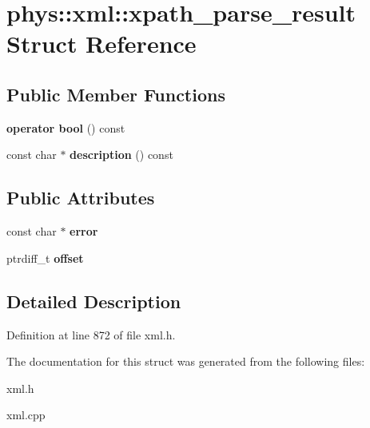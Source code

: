 \hypertarget{structphys_1_1xml_1_1xpath__parse__result}{
\section{phys::xml::xpath\_\-parse\_\-result Struct Reference}
\label{d3/d82/structphys_1_1xml_1_1xpath__parse__result}
}
\subsection*{Public Member Functions}
\begin{DoxyCompactItemize}
\item 
\hypertarget{structphys_1_1xml_1_1xpath__parse__result_a6dcc7705327a53c40d27951f1fa135e8}{
{\bfseries operator bool} () const }
\label{d3/d82/structphys_1_1xml_1_1xpath__parse__result_a6dcc7705327a53c40d27951f1fa135e8}

\item 
\hypertarget{structphys_1_1xml_1_1xpath__parse__result_ad4a6c1b6f5b15a51f363eb1ba80ba328}{
const char $\ast$ {\bfseries description} () const }
\label{d3/d82/structphys_1_1xml_1_1xpath__parse__result_ad4a6c1b6f5b15a51f363eb1ba80ba328}

\end{DoxyCompactItemize}
\subsection*{Public Attributes}
\begin{DoxyCompactItemize}
\item 
\hypertarget{structphys_1_1xml_1_1xpath__parse__result_aa22bdd4bda9b88bf8fabfe0a6da3f0f8}{
const char $\ast$ {\bfseries error}}
\label{d3/d82/structphys_1_1xml_1_1xpath__parse__result_aa22bdd4bda9b88bf8fabfe0a6da3f0f8}

\item 
\hypertarget{structphys_1_1xml_1_1xpath__parse__result_a56213a26c0e24a7f2d1212ff6095bc51}{
ptrdiff\_\-t {\bfseries offset}}
\label{d3/d82/structphys_1_1xml_1_1xpath__parse__result_a56213a26c0e24a7f2d1212ff6095bc51}

\end{DoxyCompactItemize}


\subsection{Detailed Description}


Definition at line 872 of file xml.h.



The documentation for this struct was generated from the following files:\begin{DoxyCompactItemize}
\item 
xml.h\item 
xml.cpp\end{DoxyCompactItemize}
